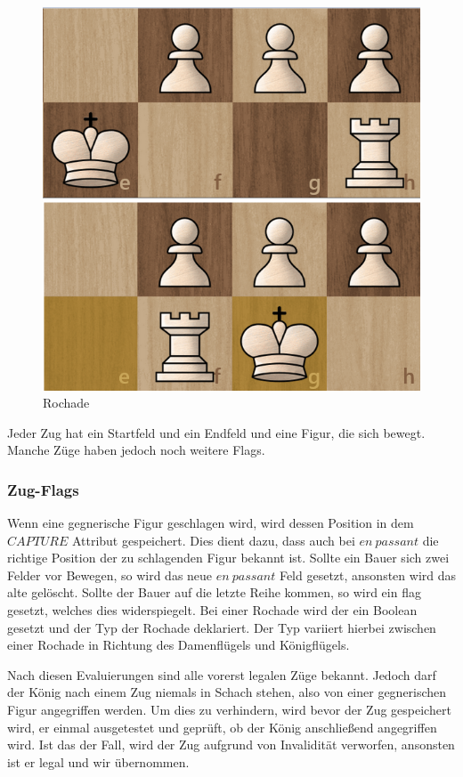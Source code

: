 \begin{figure}[H]
    \centering
    \includegraphics[scale=0.3]{images/rochade.png}
    \caption{Rochade}
\end{figure}

Jeder Zug hat ein Startfeld und ein Endfeld und eine Figur, die sich bewegt. Manche Züge haben jedoch noch weitere Flags. 

\subsubsection{Zug-Flags}
Wenn eine gegnerische Figur geschlagen wird, wird dessen Position in dem \(CAPTURE\) Attribut gespeichert. Dies dient dazu, dass auch bei \(en~passant\) die richtige 
Position der zu schlagenden Figur bekannt ist. Sollte ein Bauer sich zwei Felder vor Bewegen, so wird das neue \(en~passant\) Feld gesetzt, ansonsten wird das alte gelöscht.
Sollte der Bauer auf die letzte Reihe kommen, so wird ein flag gesetzt, welches dies widerspiegelt. 
Bei einer Rochade wird der ein Boolean gesetzt und der Typ der Rochade deklariert. Der Typ variiert hierbei zwischen einer Rochade in Richtung des Damenflügels und Königflügels.

Nach diesen Evaluierungen sind alle vorerst legalen Züge bekannt. Jedoch darf der König nach einem Zug niemals in Schach stehen, also von einer gegnerischen Figur 
angegriffen werden. Um dies zu verhindern, wird bevor der Zug gespeichert wird, er einmal ausgetestet und geprüft, ob der König anschließend angegriffen wird.
Ist das der Fall, wird der Zug aufgrund von Invalidität verworfen, ansonsten ist er legal und wir übernommen.

